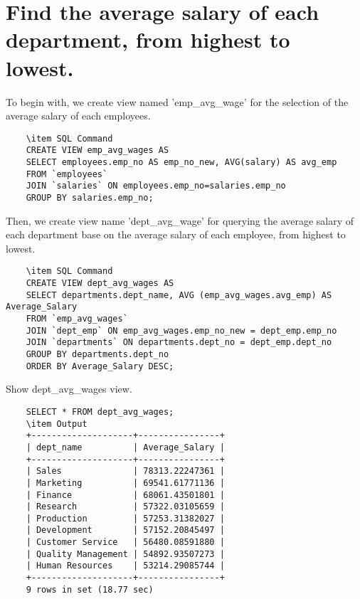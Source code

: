 \documentclass[13pt,a4paper]{report}
\begin{document}
\section{ Find the average salary of each department, from highest to lowest. }
\begin{itemize}
To begin with, we create view named 'emp_avg_wage' for the selection of the average salary of each employees.
\begin{lstlisting}
	\item SQL Command
	CREATE VIEW emp_avg_wages AS
	SELECT employees.emp_no AS emp_no_new, AVG(salary) AS avg_emp 
	FROM `employees` 
	JOIN `salaries` ON employees.emp_no=salaries.emp_no 
	GROUP BY salaries.emp_no;
\end{lstlisting}
Then, we create view name 'dept_avg_wage' for querying the average salary of each department base on the average salary of each employee, from highest to lowest.
\begin{lstlisting}
	\item SQL Command
	CREATE VIEW dept_avg_wages AS
	SELECT departments.dept_name, AVG (emp_avg_wages.avg_emp) AS Average_Salary 
	FROM `emp_avg_wages`
	JOIN `dept_emp` ON emp_avg_wages.emp_no_new = dept_emp.emp_no 
	JOIN `departments` ON departments.dept_no = dept_emp.dept_no 
	GROUP BY departments.dept_no 
	ORDER BY Average_Salary DESC;
\end{lstlisting}
Show dept_avg_wages view.
\begin{lstlisting}
	SELECT * FROM dept_avg_wages;
	\item Output
	+--------------------+----------------+
	| dept_name          | Average_Salary |
	+--------------------+----------------+
	| Sales              | 78313.22247361 |
	| Marketing          | 69541.61771136 |
	| Finance            | 68061.43501801 |
	| Research           | 57322.03105659 |
	| Production         | 57253.31382027 |
	| Development        | 57152.20845497 |
	| Customer Service   | 56480.08591880 |
	| Quality Management | 54892.93507273 |
	| Human Resources    | 53214.29085744 |
	+--------------------+----------------+
	9 rows in set (18.77 sec)
	
\end{lstlisting}
\end{itemize}
\end{document}
